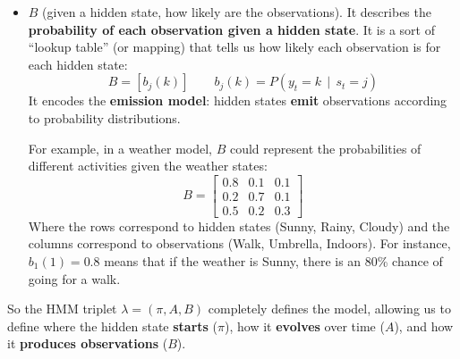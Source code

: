 \begin{itemize}
    \item {} $B$ (given a hidden state, how likely are the observations). It describes the \textbf{probability of each observation given a hidden state}. It is a sort of ``lookup table'' (or mapping) that tells us how likely each observation is for each hidden state:
    \begin{equation*}
        B = \left[b_{j}(k)\right] \qquad b_{j}(k) = P\left(y_t = k \, \mid \, s_t = j\right)
    \end{equation*}
    It encodes the \textbf{emission model}: hidden states \textbf{emit} observations according to probability distributions.

    For example, in a weather model, $B$ could represent the probabilities of different activities given the weather states:
    \begin{equation*}
        B = \begin{bmatrix}
            0.8 & 0.1 & 0.1 \\  %
            0.2 & 0.7 & 0.1 \\  %
            0.5 & 0.2 & 0.3     %
        \end{bmatrix}
    \end{equation*}
    Where the rows correspond to hidden states (Sunny, Rainy, Cloudy) and the columns correspond to observations (Walk, Umbrella, Indoors). For instance, $b_{1}(1) = 0.8$ means that if the weather is Sunny, there is an 80\% chance of going for a walk.
\end{itemize}
So the HMM triplet $\lambda = (\pi, A, B)$ completely defines the model, allowing us to define where the hidden state \textbf{starts} ($\pi$), how it \textbf{evolves} over time ($A$), and how it \textbf{produces observations} ($B$).

